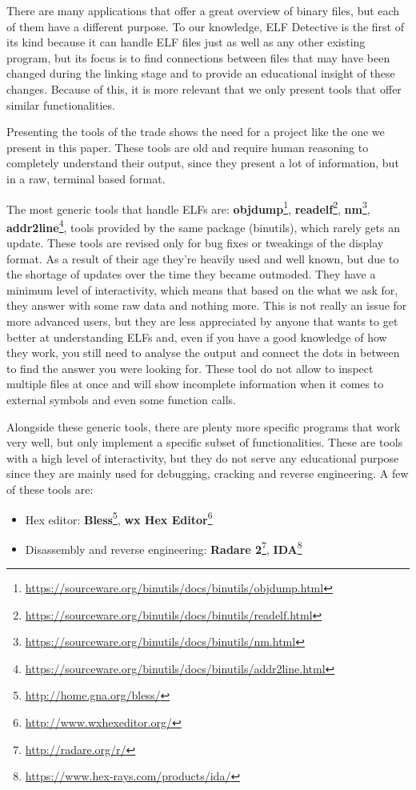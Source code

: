 There are many applications that offer a great overview of binary files, but each of them have a different purpose. To our knowledge, ELF Detective is the first of its kind because it can handle ELF files just as well as any other existing program, but its focus is to find connections between files that may have been changed during the linking stage and to provide an educational insight of these changes. Because of this, it is more relevant that we only present tools that offer similar functionalities.

Presenting the tools of the trade shows the need for a project like the one we present in this paper. These tools are old and require human reasoning to completely understand their output, since they present a lot of information, but in a raw, terminal based format.

The most generic tools that handle ELFs are: \textbf{objdump}\footnote{\url{https://sourceware.org/binutils/docs/binutils/objdump.html}}, \textbf{readelf}\footnote{\url{https://sourceware.org/binutils/docs/binutils/readelf.html}}, \textbf{nm}\footnote{\url{https://sourceware.org/binutils/docs/binutils/nm.html}}, \textbf{addr2line}\footnote{\url{https://sourceware.org/binutils/docs/binutils/addr2line.html}}, tools provided by the same package (binutils), which rarely gets an update. These tools are revised only for bug fixes or tweakings of the display format. As a result of their age they're heavily used and well known, but due to the shortage of updates over the time they became outmoded. They have a minimum level of interactivity, which means that based on the what we ask for, they answer with some raw data and nothing more. This is not really an issue for more advanced users, but they are less appreciated by anyone that wants to get better at understanding ELFs and, even if you have a good knowledge of how they work, you still need to analyse the output and connect the dots in between to find the answer you were looking for. These tool do not allow to inspect multiple files at once and will show incomplete information when it comes to external symbols and even some function calls.

Alongside these generic tools, there are plenty more specific programs that work very well, but only implement a specific subset of functionalities. These are tools with a high level of interactivity, but they do not serve any educational purpose since they are mainly used for debugging, cracking and reverse engineering. A few of these tools are:

\begin{itemize}  
	\item Hex editor: \textbf{Bless}\footnote{\url{http://home.gna.org/bless/}}, \textbf{wx Hex Editor}\footnote{\url{http://www.wxhexeditor.org/}}
	\item Disassembly and reverse engineering: \textbf{Radare 2}\footnote{\url{http://radare.org/r/}}, \textbf{IDA}\footnote{\url{https://www.hex-rays.com/products/ida/}}
\end{itemize}